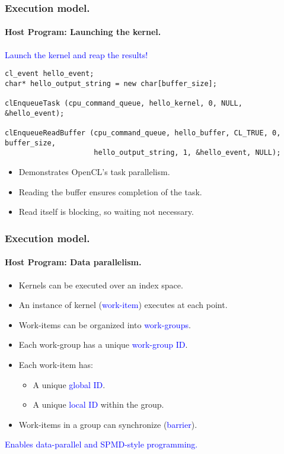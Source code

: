 \documentclass{beamer}
\begin{document}
\begin{frame}[fragile]
\frametitle{Execution model.}
\framesubtitle{Host Program: Launching the kernel.}

  \begin{center}
  \textcolor{blue}{Launch the kernel and reap the results!}
  \end{center}

  \begin{center}
  \begin{minipage}{0.75\textwidth}
  \begin{lstlisting}
cl_event hello_event;
char* hello_output_string = new char[buffer_size];

clEnqueueTask (cpu_command_queue, hello_kernel, 0, NULL, &hello_event);

clEnqueueReadBuffer (cpu_command_queue, hello_buffer, CL_TRUE, 0, buffer_size, 
                     hello_output_string, 1, &hello_event, NULL);
  \end{lstlisting}
  \end{minipage}
  \end{center}

  \begin{itemize}
  \item Demonstrates OpenCL's task parallelism.
  \item Reading the buffer ensures completion of the task.
  \item Read itself is blocking, so waiting not necessary.
  \end{itemize}
\end{frame}

\begin{frame}[fragile]
\frametitle{Execution model.}
\framesubtitle{Host Program: Data parallelism.}

  \begin{itemize}
  \item Kernels can be executed over an index space.
  \item An instance of kernel (\textcolor{blue}{work-item}) executes at each point.
  \item Work-items can be organized into \textcolor{blue}{work-groups}.
  \item Each work-group has a unique \textcolor{blue}{work-group ID}.
  \item Each work-item has:
    \begin{itemize}
    \item A unique \textcolor{blue}{global ID}.
    \item A unique \textcolor{blue}{local ID} within the group.
    \end{itemize}
  \item Work-items in a group can synchronize (\textcolor{blue}{barrier}).
  \end{itemize}

  \begin{center}
\textcolor{blue}{Enables data-parallel and SPMD-style programming.}
  \end{center}

\end{frame}
\end{document}
